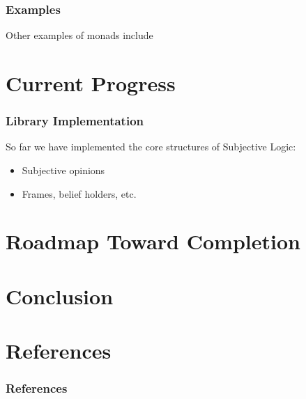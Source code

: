 \documentclass{beamer}
\begin{document}

\begin{frame}
\frametitle{Examples}

Other examples of monads include


\end{frame}

%
%

\section{Current Progress}

\begin{frame}
\frametitle{Library Implementation}

So far we have implemented the core structures of Subjective Logic:

\begin{itemize}
  \item Subjective opinions
  \item Frames, belief holders, etc.
\end{itemize}

\end{frame}











\section{Roadmap Toward Completion}


\section{Conclusion}


\section{References}

\begin{frame}[allowframebreaks]
\frametitle{References}




\end{frame}

\end{document}
